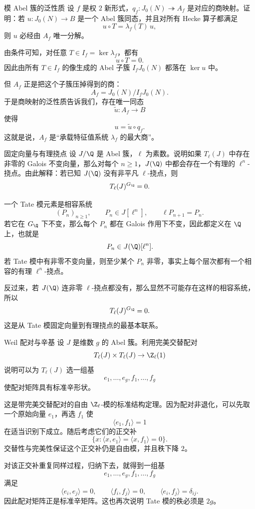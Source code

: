 \begin{problem}{模 Abel 簇的泛性质}
\hard
设 $f$ 是权 $2$ 新形式，$q_f:J_0(N)\twoheadrightarrow A_f$ 是对应的商映射。证明：若 $u:J_0(N)\to B$ 是一个 Abel 簇同态，并且对所有 Hecke 算子都满足
\[
u\circ T=\lambda_f(T)\,u,
\]
则 $u$ 必经由 $A_f$ 唯一分解。
\end{problem}
\begin{solution}
由条件可知，对任意 $T\in I_f=\ker\lambda_f$，都有
\[
u\circ T=0.
\]
因此由所有 $T\in I_f$ 的像生成的 Abel 子簇 $I_fJ_0(N)$ 都落在 $\ker u$ 中。

但 $A_f$ 正是把这个子簇压掉得到的商：
\[
A_f=J_0(N)/I_fJ_0(N).
\]
于是商映射的泛性质告诉我们，存在唯一同态
\[
\widetilde u:A_f\to B
\]
使得
\[
u=\widetilde u\circ q_f.
\]
这就是说，$A_f$ 是“承载特征值系统 $\lambda_f$ 的最大商”。
\end{solution}

\begin{problem}{固定向量与有理挠点}
\hard
设 $J/\Q$ 是 Abel 簇，$\ell$ 为素数。说明如果 $T_\ell(J)$ 中存在非零的 Galois 不变向量，那么对每个 $n\ge 1$，$J(\Q)$ 中都会存在一个有理的 $\ell^n$-挠点。由此解释：若已知 $J(\Q)$ 没有非平凡 $\ell$-挠点，则
\[
T_\ell(J)^{G_\Q}=0.
\]
\end{problem}
\begin{solution}
一个 Tate 模元素是相容系统
\[
(P_n)_{n\ge 1},
\qquad P_n\in J[\ell^n],
\qquad \ell P_{n+1}=P_n.
\]
若它在 $G_\Q$ 下不变，那么每个 $P_n$ 都在 Galois 作用下不变，因此都定义在 $\Q$ 上，也就是
\[
P_n\in J(\Q)[\ell^n].
\]
若 Tate 模中有非零不变向量，则至少某个 $P_n$ 非零，事实上每个层次都有一个相容的有理 $\ell^n$-挠点。

反过来，若 $J(\Q)$ 连非零 $\ell$-挠点都没有，那么显然不可能存在这样的相容系统，所以
\[
T_\ell(J)^{G_\Q}=0.
\]
这是从 Tate 模固定向量到有理挠点的最基本联系。
\end{solution}

\begin{problem}{Weil 配对与辛基}
\hard
设 $J$ 是维数 $g$ 的 Abel 簇。利用完美交替配对
\[
T_\ell(J)\times T_\ell(J)\to \Z_\ell(1)
\]
说明可以为 $T_\ell(J)$ 选一组基
\[
e_1,\dots,e_g,f_1,\dots,f_g
\]
使配对矩阵具有标准辛形状。
\end{problem}
\begin{solution}
这是带完美交替配对的自由 $\Z_\ell$-模的标准结构定理。因为配对非退化，可以先取一个原始向量 $e_1$，再选 $f_1$ 使
\[
\langle e_1,f_1\rangle=1
\]
在适当识别下成立。随后考虑它们的正交补
\[
\{x:\langle x,e_1\rangle=\langle x,f_1\rangle=0\}.
\]
交替性与完美性保证这个正交补仍是自由模，并且秩下降 $2$。

对该正交补重复同样过程，归纳下去，就得到一组基
\[
e_1,\dots,e_g,f_1,\dots,f_g
\]
满足
\[
\langle e_i,e_j\rangle=0,
\qquad
\langle f_i,f_j\rangle=0,
\qquad
\langle e_i,f_j\rangle=\delta_{ij}.
\]
因此配对矩阵正是标准辛矩阵。这也再次说明 Tate 模的秩必须是 $2g$。
\end{solution}

